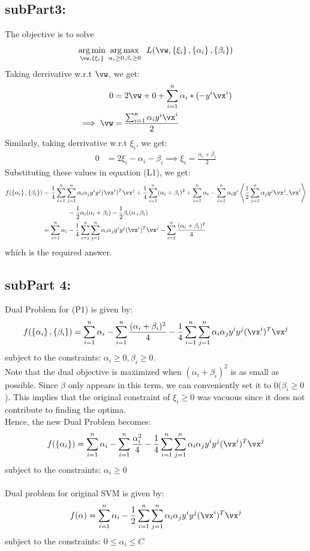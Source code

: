 \documentclass[a4paper,11pt]{article}
\begin{document}
\begin{mlsolution}
\subsection{subPart3:}
The objective is to solve $$\underset{\vw,\bc{\xi_i}}{\arg\min}\ \underset{\alpha_i \geq 0, \beta_i \geq 0}{\arg\max}\ \ L(\vw,\bc{\xi_i}, \bc{\alpha_i}, \bc{\beta_i})$$
Taking derrivative w.r.t $\vw$, we get:
\begin{align*}
	0 &= 2\vw + 0 + \sum_{i=1}^{n} \alpha_i * (-y^i\vx^i)\\
	\implies \vw &= \frac{\sum_{i=1}^{n} \alpha_iy^i\vx^i}{2}
\end{align*}
Similarly, taking derrivative w.r.t $\xi_i$, we get:
\begin{align*}
	0 &= 2\xi_i - \alpha_i - \beta_i
	\implies \xi_i = \frac{\alpha_i + \beta_i}{2}
\end{align*}
Substituting these values in equation (L1), we get:
\begin{align*}
	f(\bc{\alpha_i}, \bc{\beta_i}) 
			&= \frac{1}{4}\sum_{i=1}^{n}\sum_{j=1}^{n}\alpha_i\alpha_jy^iy^j(\vx^i)^T\vx^j + \frac{1}{4}\sum_{i=1}^{n}(\alpha_i +\beta_i)^2 +
			\sum_{i=1}^n\alpha_i
			- \sum_{i=1}^n \alpha_i y^i \ip{\frac{1}{2}\sum_{j=1}^{n} \alpha_j y^j \vx^j}{\vx^i}\\
			& \qquad\qquad-\frac{1}{2}\alpha_i(\alpha_i + \beta_i) -\frac{1}{2}\beta_i(\alpha_ + \beta_i)\\
			&= \sum_{i=1}^n \alpha_i -\frac{1}{4}\sum_{i=1}^{n}\sum_{j=1}^{n}\alpha_i\alpha_jy^iy^j(\vx^i)^T\vx^j - \sum_{i=1}^n\frac{(\alpha_i + \beta_i)^2}{4}
\end{align*}
which is the required answer.

\subsection{subPart 4:}
Dual Problem for (P1) is given by: $$f(\bc{\alpha_i}, \bc{\beta_i}) = \sum_{i=1}^n \alpha_i - \sum_{i=1}^n\frac{(\alpha_i + \beta_i)^2}{4} - \frac{1}{4} \sum_{i=1}^{n}\sum_{j=1}^{n}\alpha_i\alpha_jy^iy^j(\vx^i)^T\vx^j$$ subject to the constraints: $\alpha_i \geq 0, \beta_i \geq 0$.\\
Note that the dual objective is maximized when $(\alpha_i + \beta_i)^2$ is as small as possible. Since $\beta$ only appears in this term, we can conveniently set it to 0($\beta_i \geq 0$). This implies that the original constraint of $\xi_i \geq 0$ was vacuous since it does not contribute to finding the optima.\\
Hence, the new Dual Problem becomes:
$$ f(\bc{\alpha_i}) = \sum_{i=1}^n \alpha_i - \sum_{i=1}^n\frac{\alpha_i^2}{4} - \frac{1}{4} \sum_{i=1}^{n}\sum_{j=1}^{n}\alpha_i\alpha_jy^iy^j(\vx^i)^T\vx^j$$ subject to the constraints: $\alpha_i \geq 0$ 
\\ \\ 
Dual problem for original SVM is given by:
$$f(\alpha) = \sum_{i=1}^n \alpha_i - \frac{1}{2} \sum_{i=1}^{n}\sum_{j=1}^{n}\alpha_i\alpha_jy^iy^j(\vx^i)^T\vx^j$$
subject to the constraints: $0 \leq \alpha_i \leq C$


\end{mlsolution}
\end{document}
